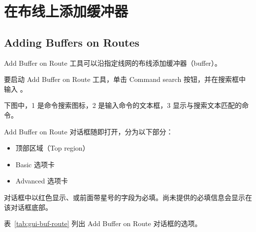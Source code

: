 
\section{在布线上添加缓冲器}
\subsection*{Adding Buffers on Routes}

Add Buffer on Route 工具可以沿指定线网的布线添加缓冲器（buffer）。

要启动 Add Buffer on Route 工具，单击 Command search 按钮，并在搜索框中输入 。

下图中，1 是命令搜索图标，2 是输入命令的文本框，3 显示与搜索文本匹配的命令。

Add Buffer on Route 对话框随即打开，分为以下部分：
\begin{itemize}
  \item 顶部区域（Top region）
  \item Basic 选项卡
  \item Advanced 选项卡
\end{itemize}

对话框中以红色显示、或前面带星号的字段为必填。尚未提供的必填信息会显示在该对话框底部。

表~\ref{tab:gui-buf-route} 列出 Add Buffer on Route 对话框的选项。

